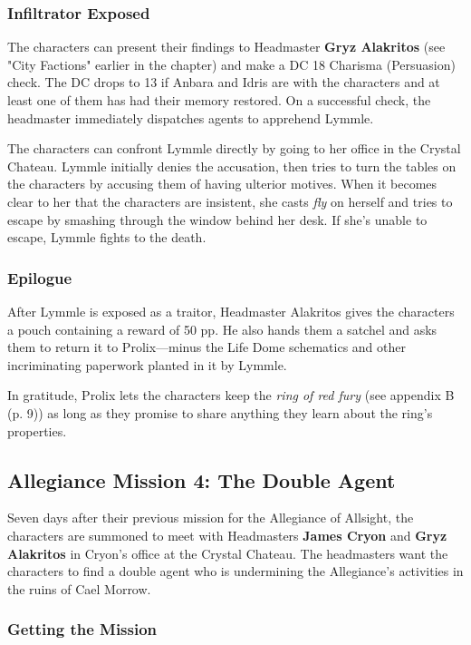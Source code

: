 \documentclass[a4paper, 11pt, bg=full, twocolumn, nooutline]{dndbook}
\begin{document}
\subsubsection{Infiltrator Exposed}

The characters can present their findings to Headmaster \textbf{Gryz Alakritos} (see "City Factions" earlier in the chapter) and make a DC 18 Charisma (Persuasion) check. The DC drops to 13 if Anbara and Idris are with the characters and at least one of them has had their memory restored. On a successful check, the headmaster immediately dispatches agents to apprehend Lymmle.

The characters can confront Lymmle directly by going to her office in the Crystal Chateau. Lymmle initially denies the accusation, then tries to turn the tables on the characters by accusing them of having ulterior motives. When it becomes clear to her that the characters are insistent, she casts \textit{fly} on herself and tries to escape by smashing through the window behind her desk. If she's unable to escape, Lymmle fights to the death.

\subsubsection{Epilogue}

After Lymmle is exposed as a traitor, Headmaster Alakritos gives the characters a pouch containing a reward of 50 pp. He also hands them a satchel and asks them to return it to Prolix---minus the Life Dome schematics and other incriminating paperwork planted in it by Lymmle.

In gratitude, Prolix lets the characters keep the \textit{ring of red fury} (see appendix B (p. 9)) as long as they promise to share anything they learn about the ring's properties.

\subsection{Allegiance Mission 4: The Double Agent}

Seven days after their previous mission for the Allegiance of Allsight, the characters are summoned to meet with Headmasters \textbf{James Cryon} and \textbf{Gryz Alakritos} in Cryon's office at the Crystal Chateau. The headmasters want the characters to find a double agent who is undermining the Allegiance's activities in the ruins of Cael Morrow.

\subsubsection{Getting the Mission}
\end{document}
